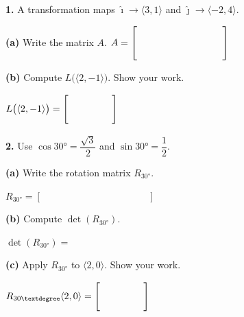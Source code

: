 \documentclass[10pt]{article}
\begin{document}
\namedateperiod
\vspace{0.10in}

\begin{notesbox}
\textbf{1.} A transformation maps $\hat{\imath}\to\langle3,1\rangle$ and
$\hat{\jmath}\to\langle-2,4\rangle$.

\vspace{0.06in}
\textbf{(a)} Write the matrix $A$. \hspace{1em}
$A = \begin{bmatrix}\hspace{1.4cm}&\hspace{1.4cm}\\[10pt]\hspace{1.4cm}&\hspace{1.4cm}\end{bmatrix}$

\vspace{0.12in}
\textbf{(b)} Compute $L\bigl(\langle2,-1\rangle\bigr)$. Show your work.


$L\bigl(\langle2,-1\rangle\bigr) = \begin{bmatrix}\hspace{1.6cm}\\[8pt]\hspace{1.6cm}\end{bmatrix}$
\end{notesbox}

\vspace{0.10in}

\begin{notesbox}
\textbf{2.} Use $\cos30°=\dfrac{\sqrt{3}}{2}$ and $\sin30°=\dfrac{1}{2}$.

\vspace{0.06in}
\textbf{(a)} Write the rotation matrix $R_{30°}$.

\vspace{0.08in}
$R_{30°} = \begin{bmatrix}\hspace{2cm}&\hspace{2cm}\\[10pt]\hspace{2cm}&\hspace{2cm}\end{bmatrix}$

\vspace{0.12in}
\textbf{(b)} Compute $\det(R_{30°})$.

\vspace{0.06in}
$\det(R_{30°}) = $ \blank{3cm}

\vspace{0.12in}
\textbf{(c)} Apply $R_{30°}$ to $\langle2,0\rangle$. Show your work.


$R_{30°}\langle2,0\rangle = \begin{bmatrix}\hspace{1.6cm}\\[8pt]\hspace{1.6cm}\end{bmatrix}$
\end{notesbox}
\end{document}
